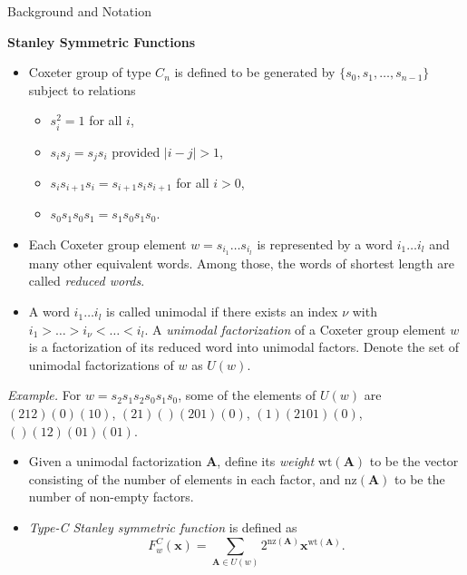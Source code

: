 \documentclass[final]{beamer}
\newcommand{\darkred}{\color{darkred}} %
\newcommand{\defn}[1]{\emph{\darkred #1}} %
\newcommand{\wt}{\mathrm{wt}}
\newcommand{\nz}{\mathrm{nz}}
\newlength{\onecolwid}
\newlength{\twocolwid}
\begin{document}
\begin{frame}[t]
\begin{columns}[t]
\begin{column}{\twocolwid}
\begin{columns}[t]
\begin{column}{\onecolwid}
\begin{block}{Background and Notation}

\textbf{Stanley Symmetric Functions}
\begin{itemize}
\item Coxeter group of type $C_n$ is defined to be generated by $\{s_0, s_1, \ldots, s_{n-1}\}$ subject to relations
	\begin{itemize}
	\item $s_i^2 = 1$ for all $i$,  
	\item $s_i s_j = s_j s_i$ provided $|i-j|>1$, 
	\item $s_i s_{i+1} s_i = s_{i+1} s_i s_{i+1}$ for all $i>0$,
	\item $s_0 s_1 s_0 s_1 = s_1 s_0 s_1 s_0$.
	\end{itemize}
\item Each Coxeter group element $w=s_{i_1}\ldots s_{i_l}$ is represented by a word $i_1\ldots i_l$ and many other equivalent words. Among those, the words of shortest length are called \defn{reduced words}.

\item A word $i_1\ldots i_l$ is called unimodal if there exists an index $\nu$ with $i_1 > \ldots > i_\nu < \ldots < i_l$.  A \defn{unimodal factorization} of a Coxeter group element $w$ is a factorization of its reduced word into unimodal factors. Denote the set of unimodal factorizations of $w$ as $U(w)$.

\end{itemize}

\textit{Example.} For $w=s_2 s_1 s_2 s_0 s_1 s_0$, some of the elements of $U(w)$ are $(212)(0)(10)$, $(21)()(201)(0)$, $(1)(2101)(0)$, $()(12)(01)(01)$.


\begin{itemize}

\item Given a unimodal factorization $\mathbf{A}$, define its \defn{weight} $\wt(\mathbf{A})$ to be the vector 
consisting of the number of elements in each factor, and $\nz(\mathbf{A})$ to be the number of non-empty factors.

\item \defn{Type-C Stanley symmetric function} is defined as 
$$F^C_w(\mathbf{x}) = \sum_{\mathbf{A} \in U(w)} 2^{\nz(\mathbf{A})} \mathbf{x}^{\wt(\mathbf{A})}.$$
\end{itemize}
\vskip 15pt


\end{block}
\end{column}
\end{columns}
\end{column}
\end{columns}
\end{frame}
\end{document}
